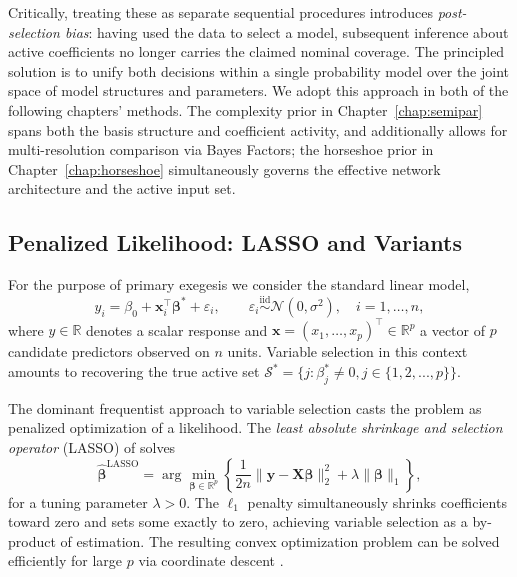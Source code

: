 Critically, treating these as separate sequential procedures
introduces \emph{post-selection bias}: having used the data to
select a model, subsequent inference about active coefficients no
longer carries the claimed nominal coverage. 
The principled solution is to unify both decisions within a single probability model over the joint space of model structures and parameters. 
We adopt this approach in both of the following chapters' methods.  The complexity prior in Chapter~\ref{chap:semipar} spans both the basis structure and coefficient activity, 
and additionally allows for multi-resolution comparison via Bayes Factors;
the horseshoe prior in Chapter~\ref{chap:horseshoe} simultaneously governs the effective
network architecture and the active input set.


\subsection{Penalized Likelihood: LASSO and Variants}
\label{subsec:lasso}

For the purpose of primary exegesis we consider the standard linear model,
\begin{equation}
  y_i = \beta_0 + \mathbf{x}_i^\top \boldsymbol{\beta}^* + \varepsilon_i,
  \qquad
  \varepsilon_i \overset{\mathrm{iid}}{\sim} \mathcal{N}(0, \sigma^2),
  \quad i = 1, \ldots, n,
  \label{eq:linear-model}
\end{equation}
where $y \in \mathbb{R}$ denotes a scalar response and
$\mathbf{x} = (x_1, \ldots, x_p)^\top \in \mathbb{R}^p$ a vector
of $p$ candidate predictors observed on $n$ units. 
Variable selection in this context amounts to recovering the true active set
$\mathcal{S}^* = \{j : \beta_j^* \neq 0, j \in \{1, 2, ..., p\}\}$.

The dominant frequentist approach to variable selection casts the
problem as penalized optimization of a likelihood. 
The \emph{least absolute shrinkage and selection operator} (LASSO)
of \citet{tibshirani_regression_1996} solves
\begin{equation}
  \hat{\boldsymbol{\beta}}^{\mathrm{LASSO}}
  = \arg\min_{\boldsymbol{\beta} \in \mathbb{R}^p}
  \left\{
    \frac{1}{2n}\|\mathbf{y} - \mathbf{X}\boldsymbol{\beta}\|_2^2
    + \lambda\|\boldsymbol{\beta}\|_1
  \right\},
  \label{eq:lasso}
\end{equation}
for a tuning parameter $\lambda > 0$. The $\ell_1$ penalty
simultaneously shrinks coefficients toward zero and sets some
exactly to zero, achieving variable selection as a by-product of
estimation. The resulting convex optimization problem can be solved
efficiently for large $p$ via coordinate descent
\citep[see][]{friedman2010glmnet}.


